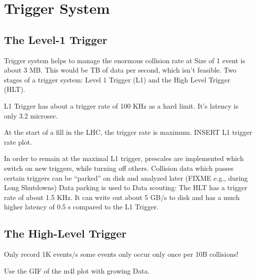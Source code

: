 \section{Trigger System}
\label{sec:trigger}

\subsection{The Level-1 Trigger}
\label{sec:L1_trig}

Trigger system helps to manage the enormous collision rate at 
Size of 1 event is about 3 MB.
This would be TB of data per second, which isn't feasible.
Two stages of a trigger system: Level 1 Trigger (L1) and the High Level Trigger (HLT).

L1 Trigger has about a trigger rate of 100 KHz as a hard limit.
It's latency is only 3.2 microsec.

At the start of a fill in the LHC, the trigger rate is maximum.
INSERT L1 trigger rate plot.

In order to remain at the maximal L1 trigger, prescales are implemented which switch on new triggers, while turning off others.
Collision data which passes certain triggers can be ``parked'' on disk and analyzed later (FIXME e.g., during Long Shutdowns)  Data parking is used to 
Data scouting: 
The HLT has a trigger rate of about 1.5 KHz.
It can write out about 5 GB/s to disk and has a much higher latency of 0.5 s compared to the L1 Trigger.

\subsection{The High-Level Trigger}
\label{sec:hlt}

Only record 1K events/s some events only occur only once per 10B collisions!

Use the GIF of the m4l plot with growing Data.